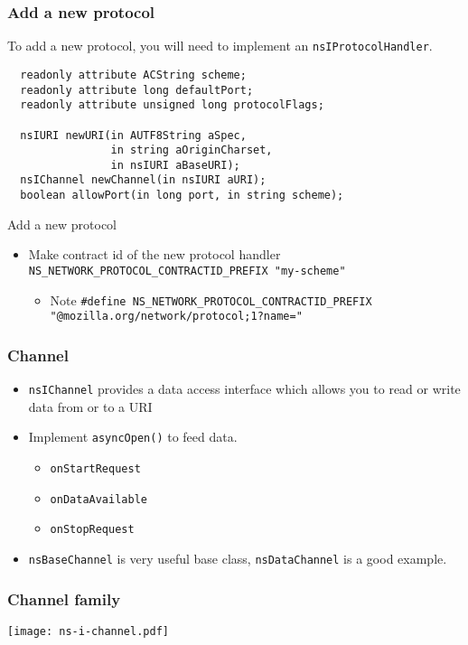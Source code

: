 \documentclass{beamer}
\begin{document}
\begin{frame}[fragile]
  \frametitle{Add a new protocol}
  To add a new protocol, you will need to implement an \texttt{nsIProtocolHandler}.
\begin{verbatim}
  readonly attribute ACString scheme;
  readonly attribute long defaultPort;
  readonly attribute unsigned long protocolFlags;

  nsIURI newURI(in AUTF8String aSpec,
                in string aOriginCharset,
                in nsIURI aBaseURI);
  nsIChannel newChannel(in nsIURI aURI);
  boolean allowPort(in long port, in string scheme);
\end{verbatim}
\end{frame}

\begin{frame}{Add a new protocol}
  \begin{itemize}
  \item Make contract id of the new protocol handler \texttt{NS\_NETWORK\_PROTOCOL\_CONTRACTID\_PREFIX "my-scheme"}
    \begin{itemize}
    \item Note \texttt{\#define NS\_NETWORK\_PROTOCOL\_CONTRACTID\_PREFIX "@mozilla.org/network/protocol;1?name="}
    \end{itemize}
  \end{itemize}
\end{frame}

\begin{frame}
  \frametitle{Channel}
  \begin{itemize}
  \item \texttt{nsIChannel} provides a data access interface which allows you to read or write data from or to a URI
  \item Implement \texttt{asyncOpen()} to feed data.
    \begin{itemize}
      \item \texttt{onStartRequest}
      \item \texttt{onDataAvailable}
      \item \texttt{onStopRequest}
    \end{itemize}
  \item \texttt{nsBaseChannel} is very useful base class, \texttt{nsDataChannel} is a good example.
  \end{itemize}
\end{frame}

\begin{frame}[fragile]
  \frametitle{Channel family}
  \begin{center}
    \texttt{[image: ns-i-channel.pdf]}
  \end{center}
\end{frame}
\end{document}
